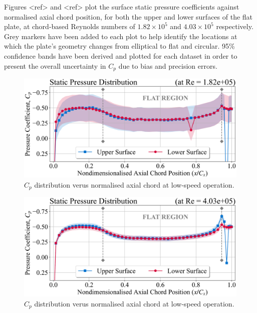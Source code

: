 \documentclass[11pt,a4paper,twocolumn]{article}
\begin{document}
Figures <ref> and <ref> plot the surface static pressure coefficients against normalised axial chord position, for both the upper and lower surfaces of the flat plate, at chord-based Reynolds numbers of $1.82\times10^5$ and $4.03\times10^5$ respectively. Grey markers have been added to each plot to help identify the locations at which the plate’s geometry changes from elliptical to flat and circular. 95\% confidence bands have been derived and plotted for each dataset in order to present the overall uncertainty in $C_p$ due to bias and precision errors.  

\begin{figure}[!ht]
{\centering
\includegraphics[width = \columnwidth]{exp_1_surface_pressure_dist_low_re.png}
\caption{$C_p$ distribution verus normalised axial chord at low-speed operation.}
\label{exp_1_fig3}}
\end{figure}

\begin{figure}[!ht]
{\centering
\includegraphics[width = \columnwidth]{exp_1_surface_pressure_dist_high_re.png}
\caption{$C_p$ distribution verus normalised axial chord at low-speed operation.}
\label{exp_1_fig4}}
\end{figure}
\end{document}
